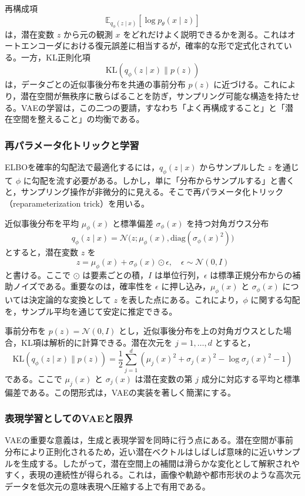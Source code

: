 再構成項
\[
\mathbb{E}_{q_{\phi}(z \mid x)}[\log p_{\theta}(x \mid z)]
\]
は，潜在変数 \(z\) から元の観測 \(x\) をどれだけよく説明できるかを測る。これはオートエンコーダにおける復元誤差に相当するが，確率的な形で定式化されている。一方，KL正則化項
\[
\mathrm{KL}(q_{\phi}(z \mid x)\|p(z))
\]
は，データごとの近似事後分布を共通の事前分布 \(p(z)\) に近づける。これにより，潜在空間が無秩序に散らばることを防ぎ，サンプリング可能な構造を持たせる。VAEの学習は，この二つの要請，すなわち「よく再構成すること」と「潜在空間を整えること」の均衡である。

\subsubsection{再パラメータ化トリックと学習}

ELBOを確率的勾配法で最適化するには，\(q_{\phi}(z \mid x)\) からサンプルした \(z\) を通じて \(\phi\) に勾配を流す必要がある。しかし，単に「分布からサンプルする」と書くと，サンプリング操作が非微分的に見える。そこで再パラメータ化トリック（reparameterization trick）を用いる。

近似事後分布を平均 \(\mu_{\phi}(x)\) と標準偏差 \(\sigma_{\phi}(x)\) を持つ対角ガウス分布
\[
q_{\phi}(z \mid x)=\mathcal{N}\bigl(z;\mu_{\phi}(x),\mathrm{diag}(\sigma_{\phi}(x)^2)\bigr)
\]
とすると，潜在変数 \(z\) を
\[
z = \mu_{\phi}(x) + \sigma_{\phi}(x) \odot \epsilon,
\quad
\epsilon \sim \mathcal{N}(0,I)
\]
と書ける。ここで \(\odot\) は要素ごとの積，\(I\) は単位行列，\(\epsilon\) は標準正規分布からの補助ノイズである。重要なのは，確率性を \(\epsilon\) に押し込み，\(\mu_{\phi}(x)\) と \(\sigma_{\phi}(x)\) については決定論的な変換として \(z\) を表した点にある。これにより，\(\phi\) に関する勾配を，サンプル平均を通じて安定に推定できる。

事前分布を \(p(z)=\mathcal{N}(0,I)\) とし，近似事後分布を上の対角ガウスとした場合，KL項は解析的に計算できる。潜在次元を \(j=1,\dots,d\) とすると，
\[
\mathrm{KL}(q_{\phi}(z \mid x)\|p(z))
=
\frac{1}{2}\sum_{j=1}^{d}
\left(
\mu_j(x)^2 + \sigma_j(x)^2 - \log \sigma_j(x)^2 - 1
\right)
\]
である。ここで \(\mu_j(x)\) と \(\sigma_j(x)\) は潜在変数の第 \(j\) 成分に対応する平均と標準偏差である。この閉形式は，VAEの実装を著しく簡潔にする。

\subsubsection{表現学習としてのVAEと限界}

VAEの重要な意義は，生成と表現学習を同時に行う点にある。潜在空間が事前分布により正則化されるため，近い潜在ベクトルはしばしば意味的に近いサンプルを生成する。したがって，潜在空間上の補間は滑らかな変化として解釈されやすく，表現の連続性が得られる。これは，画像や軌跡や都市形状のような高次元データを低次元の意味表現へ圧縮する上で有用である。

